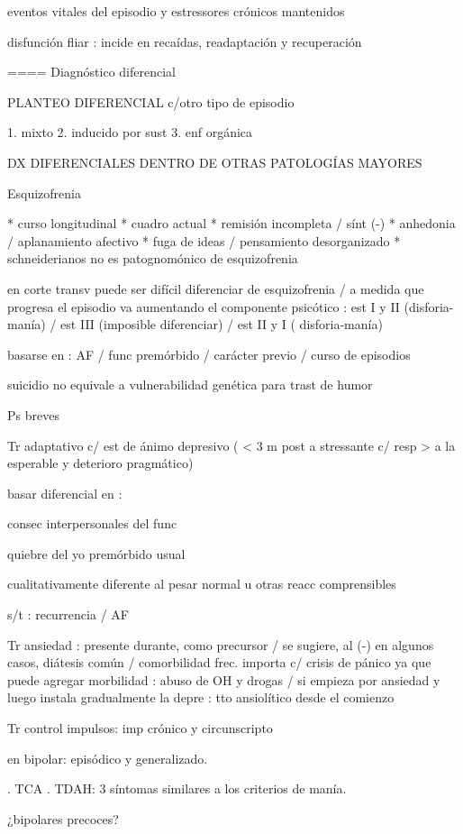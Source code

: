 eventos vitales del episodio y estressores crónicos mantenidos

disfunción fliar : incide en recaídas, readaptación y recuperación


==== Diagnóstico diferencial

PLANTEO DIFERENCIAL c/otro tipo de episodio

1. mixto
2. inducido por sust
3. enf orgánica

DX DIFERENCIALES DENTRO DE OTRAS PATOLOGÍAS MAYORES

Esquizofrenia

* curso longitudinal
* cuadro actual
* remisión incompleta / sínt (-)
* anhedonia / aplanamiento afectivo
* fuga de ideas / pensamiento desorganizado
* schneiderianos no es patognomónico de esquizofrenia

en corte transv puede ser difícil diferenciar de esquizofrenia / a medida que progresa el episodio va aumentando el componente psicótico : est I y II (disforia-manía) / est III (imposible diferenciar) / est II y I ( disforia-manía)

basarse en : AF / func premórbido / carácter previo / curso de episodios

suicidio no equivale a vulnerabilidad genética para trast de humor

Ps breves

Tr adaptativo c/ est de ánimo depresivo ( < 3 m post a stressante c/ resp > a la esperable y deterioro pragmático)

basar diferencial en :

consec interpersonales del func

quiebre del yo premórbido usual

cualitativamente diferente al pesar normal u otras reacc comprensibles

s/t : recurrencia / AF

Tr ansiedad : presente durante, como precursor / se sugiere, al (-) en algunos casos, diátesis común / comorbilidad frec. importa c/ crisis de pánico ya que puede agregar morbilidad : abuso de OH y drogas / si empieza por ansiedad y luego instala gradualmente la depre : tto ansiolítico desde el comienzo

Tr control impulsos: imp crónico y circunscripto

en bipolar: episódico y generalizado.

. TCA
. TDAH: 3 síntomas similares a los criterios de  manía.

¿bipolares precoces?

